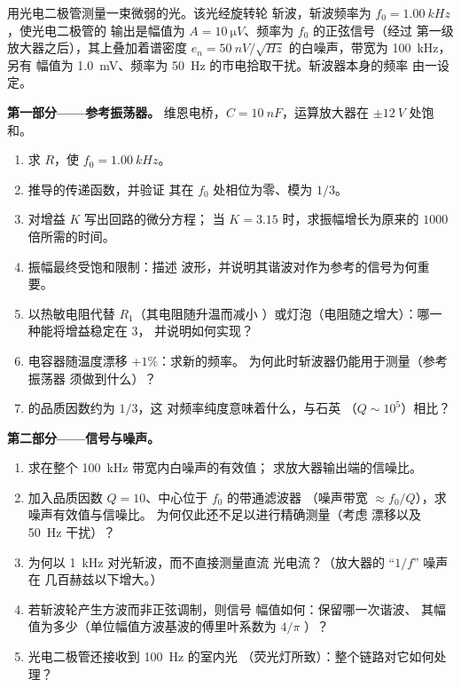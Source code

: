 \begin{problem}
\label{pb:b2:feedback-oscillators:1}

用光电二极管测量一束微弱的光。该光经旋转轮
斩波，斩波频率为 $f_0 = \qty{1.00}{kHz}$，使光电二极管的
输出是幅值为 $A = \qty{10}{\micro V}$、频率为 $f_0$ 的正弦信号（经过
第一级放大器之后），其上叠加着谱密度
$e_n = \qty{50}{nV/\sqrt{Hz}}$ 的白噪声，带宽为 \qty{100}{kHz}，另有
幅值为 \qty{1.0}{mV}、频率为 \qty{50}{Hz} 的市电拾取干扰。斩波器本身的频率
由一设定。

\medskip
\noindent\textbf{第一部分——参考振荡器。}
维恩电桥，$C = \qty{10}{nF}$，运算放大器在 $\pm\qty{12}{V}$ 处饱和。
\begin{enumerate}
  \item 求 $R$，使 $f_0 = \qty{1.00}{kHz}$。
  \item 推导的传递函数，并验证
        其在 $f_0$ 处相位为零、模为 $1/3$。
  \item 对增益 $K$ 写出回路的微分方程；
        当 $K = 3.15$ 时，求振幅增长为原来的 $1000$ 倍所需的时间。
  \item 振幅最终受饱和限制：描述
        波形，并说明其谐波对作为参考的信号为何重要。
  \item 以热敏电阻代替 $R_1$（其电阻随升温而减小
        ）或灯泡（电阻随之增大）：哪一种能将增益稳定在 3，
        并说明如何实现？
  \item 电容器随温度漂移 $+1\%$：求新的频率。
        为何此时斩波器仍能用于测量（参考振荡器
        须做到什么）？
  \item {}的品质因数约为 $1/3$，这
        对频率纯度意味着什么，与石英
        （$Q \sim 10^5$）相比？
\end{enumerate}

\medskip
\noindent\textbf{第二部分——信号与噪声。}
\begin{enumerate}[resume]
  \item 求在整个 \qty{100}{kHz} 带宽内白噪声的有效值；
        求放大器输出端的信噪比。
  \item 加入品质因数 $Q = 10$、中心位于 $f_0$ 的带通滤波器
        （噪声带宽 $\approx f_0/Q$），求噪声有效值与信噪比。
        为何仅此还不足以进行精确测量（考虑
        漂移以及 \qty{50}{Hz} 干扰）？
  \item 为何以 \qty{1}{kHz} 对光斩波，而不直接测量直流
        光电流？（放大器的 “$1/f$” 噪声在
        几百赫兹以下增大。）
  \item 若斩波轮产生方波而非正弦调制，则信号
        幅值如何：保留哪一次谐波、
        其幅值为多少（单位幅值方波基波的傅里叶系数为 $4/\pi$
        ）？
  \item 光电二极管还接收到 \qty{100}{Hz} 的室内光
        （荧光灯所致）：整个链路对它如何处理？
\end{enumerate}


\end{problem}
